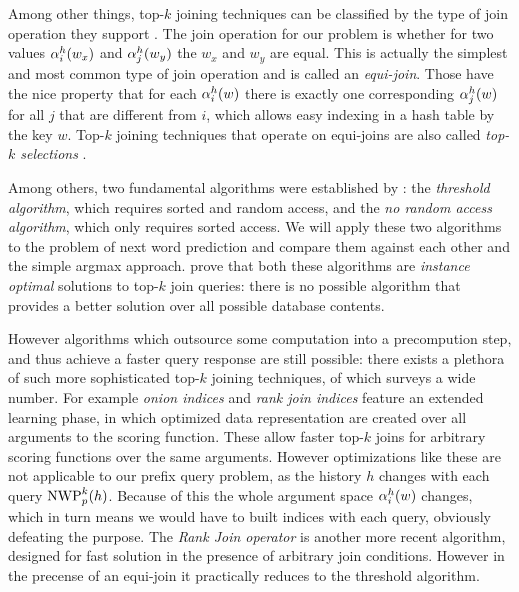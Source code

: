 Among other things, top-$k$ joining techniques can be classified by the type
of join operation they support \parencite{Ilyas2008}.
The join operation for our problem is whether for two values $\alpha^h_i(w_x)$
and $\alpha^h_j(w_y)$ the $w_x$ and $w_y$ are equal.
This is actually the simplest and most common type of join operation and is
called an \emph{equi-join}.
Those have the nice property that for each $\alpha^h_i(w)$ there is exactly one
corresponding $\alpha^h_j(w)$ for all $j$ that are different from $i$, which
allows easy indexing in a hash table by the key $w$.
Top-$k$ joining techniques that operate on equi-joins are also called
\emph{top-$k$ selections} \parencite{Ilyas2008}.

Among others, two fundamental algorithms were established by
\textcite{Fagin2001}: the \emph{threshold algorithm}, which requires sorted and
random access, and the \emph{no random access algorithm}, which only requires
sorted access.
We will apply these two algorithms to the problem of next word prediction and
compare them against each other and the simple argmax approach.
\textcite{Fagin2001} prove that both these algorithms are \emph{instance
optimal} solutions to top-$k$ join queries: there is no possible algorithm
that provides a better solution over all possible database contents.

However algorithms which outsource some computation into a precompution step, and thus
achieve a faster query response are still possible:
there exists a plethora of such more sophisticated top-$k$ joining techniques,
of which \textcite{Ilyas2008} surveys a wide number.
For example \emph{onion indices} \parencite{Chang2000} and
\emph{rank join indices} \parencite{Tsaparas2003} feature an extended learning
phase, in which optimized data representation are created over all arguments to
the scoring function.
These allow faster top-$k$ joins for arbitrary scoring functions over the same
arguments.
However optimizations like these are not applicable to our prefix query problem,
as the history $h$ changes with each query $\NWP[p][k](h)$.
Because of this the whole argument space $\alpha^h_i(w)$ changes, which in turn
means we would have to built indices with each query, obviously defeating the
purpose.
The \emph{Rank Join operator} \parencite{Ilyas2004} is another more recent
algorithm, designed for fast solution in the presence of arbitrary join
conditions.
However in the precense of an equi-join it practically reduces to the threshold
algorithm.

